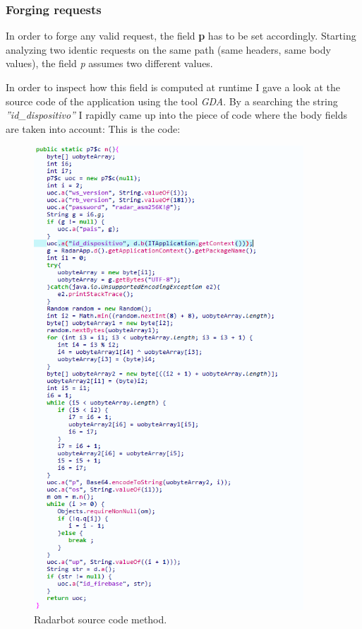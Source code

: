 		\subsubsection{Forging requests}
			\par In order to forge any valid request, the field \textbf{p} has to be set accordingly. Starting analyzing two identic requests on the same path (same headers, same body values), the field \textit{p} assumes two different values. \newline
			\par In order to inspect how this field is computed at runtime I gave a look at the source code of the application using the tool \textit{GDA}. By a searching the string \textit{''id\_dispositivo''} I rapidly came up into the piece of code where the body fields are taken into account: This is the code:
			\begin{figure}[ht]
				\centering
				\includegraphics[width=0.9\textwidth]{images/radarbot_gda.png}
				\caption{Radarbot source code method.}
			\end{figure}
